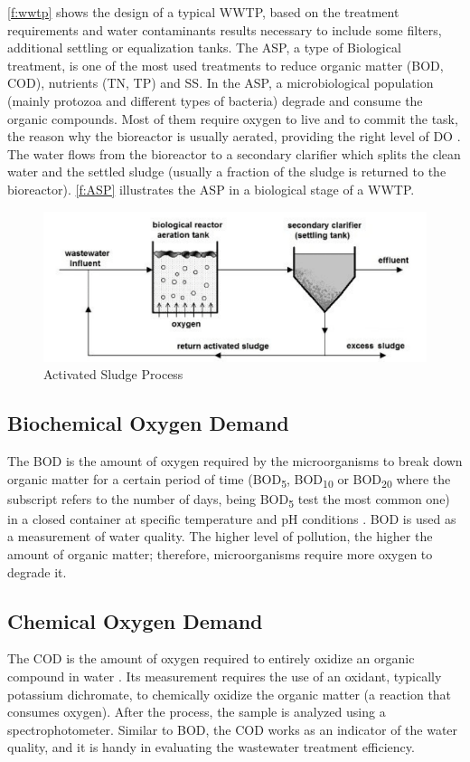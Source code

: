 \autoref{f:wwtp} shows the design of a typical \ac{WWTP}, based on the treatment requirements and water contaminants results necessary to include some filters, additional settling or equalization tanks.
The \ac{ASP}, a type of Biological treatment, is one of the most used treatments to reduce organic matter (\ac{BOD}, \ac{COD}), nutrients (\ac{TN}, \ac{TP}) and \ac{SS}. In the \ac{ASP}, a microbiological population (mainly protozoa and different types of bacteria) degrade and consume the organic compounds. Most of them require oxygen to live and to commit the task, the reason why the bioreactor is usually aerated, providing the right level of \ac{DO} \cite{Haimi2013}. The water flows from the bioreactor to a secondary clarifier which splits the clean water and the settled sludge (usually a fraction of the sludge is returned to the bioreactor). \autoref{f:ASP} illustrates the \ac{ASP} in a biological stage of a \ac{WWTP}.

\begin{figure}[h]
\centering
\includegraphics[width=14cm]{figures/Ch2/ASP.pdf}
\caption{Activated Sludge Process \cite{Fracz2016}}
\label{f:ASP}
\end{figure}

\subsection{Biochemical Oxygen Demand}
The \ac{BOD} is the amount of oxygen required by the microorganisms to break down organic matter for a certain period of time (BOD\textsubscript{5}, BOD\textsubscript{10} or BOD\textsubscript{20} where the subscript refers to the number of days, being BOD\textsubscript{5} test the most common one) in a closed container at specific temperature and pH conditions \cite{Wiesmann2007}. \ac{BOD} is used as a measurement of water quality. The higher level of pollution, the higher the amount of organic matter; therefore, microorganisms require more oxygen to degrade it.

\subsection{Chemical Oxygen Demand}
The \ac{COD} is the amount of oxygen required to entirely oxidize an organic compound in water \cite{Wiesmann2007}. Its measurement requires the use of an oxidant, typically potassium dichromate, to chemically oxidize the organic matter (a reaction that consumes oxygen). After the process, the sample is analyzed using a spectrophotometer. Similar to \ac{BOD}, the \ac{COD} works as an indicator of the water quality, and it is handy in evaluating the wastewater treatment efficiency.

